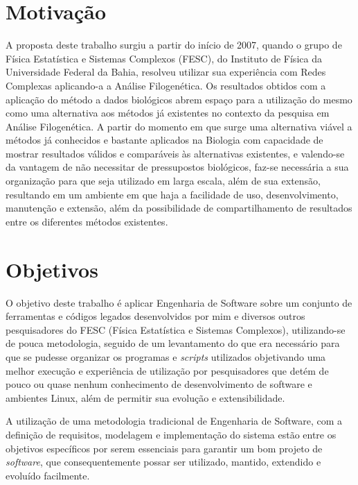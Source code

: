 \section{Motivação}

A proposta deste trabalho surgiu a partir do início de 2007, quando o grupo de Física Estatística e Sistemas Complexos (FESC),
do Instituto de Física da Universidade Federal da Bahia, resolveu utilizar sua experiência com Redes Complexas aplicando-a a Análise Filogenética.
Os resultados obtidos com a aplicação do método a dados biológicos abrem espaço para a utilização do mesmo como uma alternativa aos métodos
já existentes no contexto da pesquisa em Análise Filogenética. A partir do momento em que surge uma alternativa viável a métodos já conhecidos
e bastante aplicados na Biologia com capacidade de mostrar resultados válidos e comparáveis às alternativas existentes, e valendo-se da vantagem
de não necessitar de pressupostos biológicos, faz-se necessária a sua organização para que seja utilizado em larga escala, além de sua extensão,
resultando em um ambiente em que haja a facilidade de uso, desenvolvimento, manutenção e extensão, além da possibilidade de compartilhamento de
resultados entre os diferentes métodos existentes.

\section{Objetivos} \label{sec:objetivos}

O objetivo deste trabalho é aplicar Engenharia de Software sobre um conjunto de ferramentas e códigos legados desenvolvidos por mim e diversos outros
pesquisadores do FESC (Física Estatística e Sistemas Complexos), utilizando-se de pouca metodologia, seguido de um levantamento do que era necessário para que
se pudesse organizar os programas e \textit{scripts} utilizados objetivando uma melhor execução e experiência de utilização por pesquisadores que detém de
pouco ou quase nenhum conhecimento de desenvolvimento de software e ambientes Linux, além de permitir sua evolução e extensibilidade.

A utilização de uma metodologia tradicional de Engenharia de Software, com a definição de requisitos, modelagem e implementação do sistema estão entre os
objetivos específicos por serem essenciais para garantir um bom projeto de \textit{software}, que consequentemente possar ser utilizado, mantido, extendido
e evoluído facilmente.


